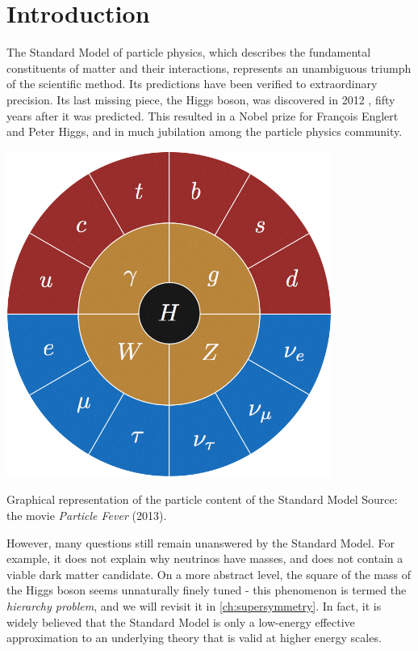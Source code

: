 \chapter{Introduction}\label{ch:introduction}
The Standard Model of particle physics, which describes the fundamental constituents of matter and their interactions, represents an unambiguous triumph of the scientific method. Its predictions have been verified to extraordinary precision. Its last missing piece, the Higgs boson, was discovered in 2012 \cite{Aad:2012tfa,Chatrchyan:2012xdj}, fifty years after it was predicted. This resulted in a Nobel prize for François Englert and Peter Higgs, and in much jubilation among the particle physics community. 

\begin{marginfigure}[2.5cm]
  \centering
  \includegraphics[width=0.8\textwidth]{images/SM-wheel.png}
  \caption{Graphical representation of the particle content of the Standard Model Source: the movie \emph{Particle Fever} (2013).}
\end{marginfigure}

However, many questions still remain unanswered by the Standard Model. For example, it does not explain why neutrinos have masses, and does not contain a viable dark matter candidate. On a more abstract level, the square of the mass of the Higgs boson seems unnaturally finely tuned - this phenomenon is termed the \emph{hierarchy problem}, and we will revisit it in \autoref{ch:supersymmetry}. In fact, it is widely believed that the Standard Model is only a low-energy effective approximation to an underlying theory that is valid at higher energy scales.

